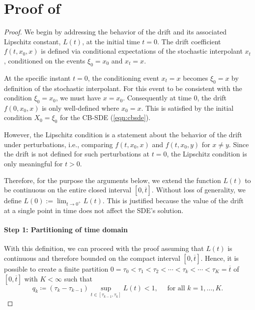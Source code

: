 \section{Proof of } \label{prf:thm:exist}
\restatethmexist*
\begin{proof}
  We begin by addressing the behavior of the drift and its associated Lipschitz constant, \(L(t)\), at the initial time \(t = 0\). The drift coefficient \(f(t, x_{0}, x)\) is defined via conditional expectations of the stochastic interpolant \(x_{t}\), conditioned on the events \(\xi_{0} = x_{0}\) and \(x_{t} = x\).

  At the specific instant \(t = 0\), the conditioning event \(x_{t} = x\) becomes \(\xi_{0} = x\) by definition of the stochastic interpolant. For this event to be consistent with the condition \(\xi_{0} = x_{0}\), we must have \(x = x_{0}\). Consequently at time \(0\), the drift \(f(0, x_{0}, x)\) is only well-defined where \(x_{0} = x\). This is satisfied by the initial condition \(X_{0} = \xi_{0}\) for the CB-SDE (\ref{eqn:cbsde}).

  However, the Lipschitz condition is a statement about the behavior of the drift under perturbations, i.e., comparing \(f(t, x_0, x)\) and \(f(t, x_{0}, y)\) for \(x \neq y\). Since the drift is not defined for such perturbations at \(t = 0\), the Lipschitz condition is only meaningful for \(t > 0\).

  Therefore, for the purpose the arguments below, we  extend the function \(L(t)\) to be continuous on the entire closed interval \([0, \overline{t}]\). Without loss of generality, we define \(L(0) := \lim_{t \to 0^+} L(t)\). This is justified because the value of the drift at a single point in time does not affect the SDE's solution.
  \paragraph{Step 1: Partitioning of time domain}

  With this definition, we can proceed with the proof assuming that \(L(t)\) is continuous and therefore bounded on the compact interval \([0, \overline{t}]\). Hence, it is possible to create a finite partition \(0 = \tau_{0} < \tau_{1} < \tau_{2} < \cdots < \tau_{k} < \cdots < \tau_{K} = {\overline{t}}\) of \([0, {\overline{t}}]\) with \(K < \infty\) such that
  \[
    q_{k} \coloneqq (\tau_{k} - \tau_{k-1}) \sup_{t \in [\tau_{k-1}, \tau_{k}]} {L}(t) < 1, \quad \text{ for all } k = 1, \ldots, K.
  \]


\end{proof}
